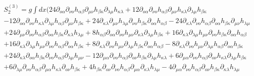 \documentclass[a4paper,12pt]{article}
\begin{document}
\begin{equation}
{}{
\begin{array}{l}
S_2^{(3)}  = g\int {dx(24\partial _{ o\alpha} \partial _{\nu o}
h_{\alpha\beta} \partial _{\mu\nu} h_{\beta\kappa} \partial
_{\lambda\mu}
 h_{\kappa\lambda}}
+ 12\partial _{ o\alpha} \partial _{\nu o} h_{\alpha\beta} \partial _{\mu\nu} h_{\kappa\lambda} \partial _{\lambda\mu} h_{\beta\kappa}   \\
   - 12\partial _{ o\alpha} \partial _{\nu o} h_{\kappa\lambda} \partial _{\lambda\mu} h_{\alpha\beta} \partial _{\mu\nu} h_{\beta\kappa}  + 24\partial _{\kappa\lambda} \partial _{\mu\nu} h_{\lambda\mu} \partial _{\nu o} h_{\beta\kappa} \partial _{ o\alpha} h_{\alpha\beta}  - 24\partial _{\kappa\lambda} \partial _{\nu o} h_{\alpha\beta} \partial _{ o\alpha} h_{\beta\kappa} \partial _{\mu\nu} h_{\lambda\mu}  \\
   + 24\partial _{\mu\nu} \partial _{\nu o} h_{\alpha\beta} \partial _{ o\alpha} h_{\beta\kappa} \partial _{\kappa\lambda} h_{\lambda\mu}  + 8h_{\alpha\beta} \partial _{ o\alpha} \partial _{\nu o} h_{\mu\nu} \partial _{\kappa\lambda} \partial _{\lambda\mu} h_{\beta\kappa}  + 16\partial _{\kappa\lambda} \partial _{\lambda\mu} h_{\mu\nu} \partial _{\nu o} h_{\beta\kappa} \partial _{ o\alpha} h_{\alpha\beta}   \\
   + 16\partial _{\kappa\lambda} \partial _{\lambda\mu} h_{\mu\nu} \partial _{\nu o} h_{\alpha\beta} \partial _{ o\alpha} h_{\beta\kappa}  + 8\partial _{\kappa\lambda} \partial _{\nu o} h_{\mu\nu} \partial _{\lambda\mu} h_{\beta\kappa} \partial _{ o\alpha} h_{\alpha\beta}  - 8\partial _{\kappa\lambda} \partial _{\nu o} h_{\mu\nu} \partial _{\lambda\mu} h_{\alpha\beta} \partial _{ o\alpha} h_{\beta\kappa}  \\
   + 24\partial _{\kappa\lambda} \partial _{ o\alpha} h_{\beta\kappa} \partial _{\nu o} h_{\alpha\beta} \partial _{\lambda\mu} h_{\mu\nu}  - 12\partial _{\mu\alpha} \partial _{\nu o} h_{\alpha\beta} \partial _{ o\nu} h_{\beta\kappa} \partial _{\lambda\mu} h_{\kappa\lambda}  + 6\partial _{\mu\alpha} \partial _{\nu o} h_{\alpha\beta} \partial _{ o\nu} h_{\kappa\lambda} \partial _{\lambda\mu} h_{\beta\kappa}  \\
   + 6\partial _{\lambda\mu} \partial _{\nu o} h_{\alpha\beta} \partial _{\mu\alpha} h_{\kappa\lambda} \partial _{ o\nu} h_{\beta\kappa}  + 4h_{\beta\kappa} \partial _{ o\nu} \partial _{\nu o} h_{\alpha\beta} \partial _{\mu\alpha} \partial _{\kappa\lambda} h_{\lambda\mu}  - 4\partial _{\mu\alpha} \partial _{\nu o} h_{\alpha\beta} \partial _{ o\nu} h_{\beta\kappa} \partial _{\kappa\lambda} h_{\lambda\mu}   \\

\end{array}}
\end{equation}
\end{document}
